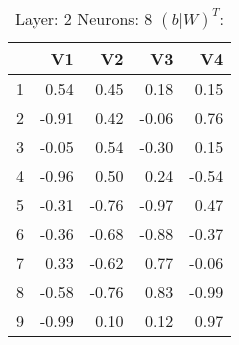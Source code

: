\begin{table}[ht]
\centering
\begin{tabular}{rrrrr}
  \hline
 & V1 & V2 & V3 & V4 \\ 
  \hline
1 & 0.54 & 0.45 & 0.18 & 0.15 \\ 
  2 & -0.91 & 0.42 & -0.06 & 0.76 \\ 
  3 & -0.05 & 0.54 & -0.30 & 0.15 \\ 
  4 & -0.96 & 0.50 & 0.24 & -0.54 \\ 
  5 & -0.31 & -0.76 & -0.97 & 0.47 \\ 
  6 & -0.36 & -0.68 & -0.88 & -0.37 \\ 
  7 & 0.33 & -0.62 & 0.77 & -0.06 \\ 
  8 & -0.58 & -0.76 & 0.83 & -0.99 \\ 
  9 & -0.99 & 0.10 & 0.12 & 0.97 \\ 
   \hline
\end{tabular}
\caption{Layer: 2 Neurons: 8  $(b|W)^T$: 
} 
\end{table}
